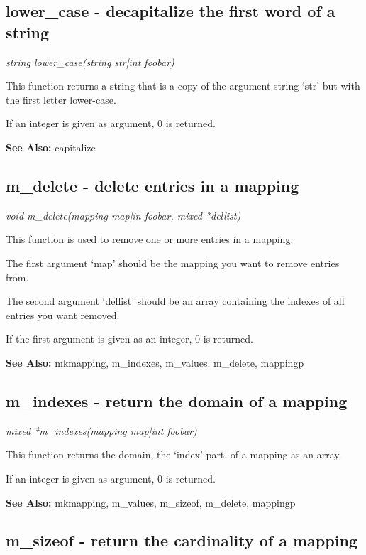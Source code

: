 \subsection{lower\_case - decapitalize the first word of a string}

    {\em string lower\_case(string str|int foobar)}

    This function returns a string that is a copy of the argument
    string `str' but with the first letter lower-case. 

    If an integer is given as argument, 0 is returned.

    {\bf See Also: }    capitalize





\subsection{m\_delete - delete entries in a mapping}

    {\em void m\_delete(mapping map|in foobar, mixed *dellist)}

    This function is used to remove one or more entries in a mapping.

    The first argument `map' should be the mapping you want to remove
    entries from.

    The second argument `dellist' should be an array containing the
    indexes of all entries you want removed.

    If the first argument is given as an integer, 0 is returned.

    {\bf See Also: }    mkmapping, m\_indexes, m\_values, m\_delete, mappingp



\subsection{m\_indexes - return the domain of a mapping}

    {\em mixed *m\_indexes(mapping map|int foobar)}

    This function returns the domain, the `index' part, of a mapping
    as an array. 

    If an integer is given as argument, 0 is returned. 

    {\bf See Also: }    mkmapping, m\_values, m\_sizeof, m\_delete, mappingp


 
\subsection{m\_sizeof - return the cardinality of a mapping}

